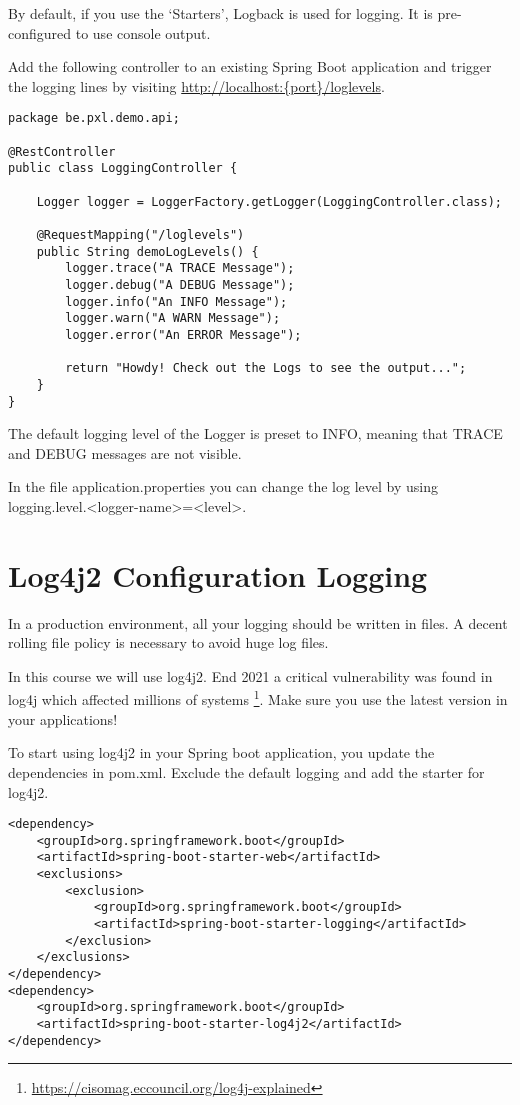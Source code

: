 By default, if you use the `Starters', Logback is used for logging. It is pre-configured to use console output.

Add the following controller to an existing Spring Boot application and trigger the logging lines by visiting \url{http://localhost:{port}/loglevels}.


\begin{lstlisting}
package be.pxl.demo.api;

@RestController
public class LoggingController {

    Logger logger = LoggerFactory.getLogger(LoggingController.class);

    @RequestMapping("/loglevels")
    public String demoLogLevels() {
        logger.trace("A TRACE Message");
        logger.debug("A DEBUG Message");
        logger.info("An INFO Message");
        logger.warn("A WARN Message");
        logger.error("An ERROR Message");

        return "Howdy! Check out the Logs to see the output...";
    }
}
\end{lstlisting}

The default logging level of the Logger is preset to INFO, meaning that TRACE and DEBUG messages are not visible.

In the file application.properties you can change the log level by using logging.level.<logger-name>=<level>.

\section{Log4j2 Configuration Logging}

In a production environment, all your logging should be written in files. A decent rolling file policy is necessary to avoid huge log files.

In this course we will use log4j2.  End 2021 a critical vulnerability was found in log4j which affected millions of systems \footnote{\url{https://cisomag.eccouncil.org/log4j-explained}}.  Make sure you use the latest version in your applications!

To start using log4j2 in your Spring boot application, you update the dependencies in pom.xml. Exclude the default logging and add the starter for log4j2.\\

\begin{lstlisting}
<dependency>
    <groupId>org.springframework.boot</groupId>
    <artifactId>spring-boot-starter-web</artifactId>
    <exclusions>
        <exclusion>
            <groupId>org.springframework.boot</groupId>
            <artifactId>spring-boot-starter-logging</artifactId>
        </exclusion>
    </exclusions>
</dependency>
<dependency>
    <groupId>org.springframework.boot</groupId>
    <artifactId>spring-boot-starter-log4j2</artifactId>
</dependency>
\end{lstlisting}


